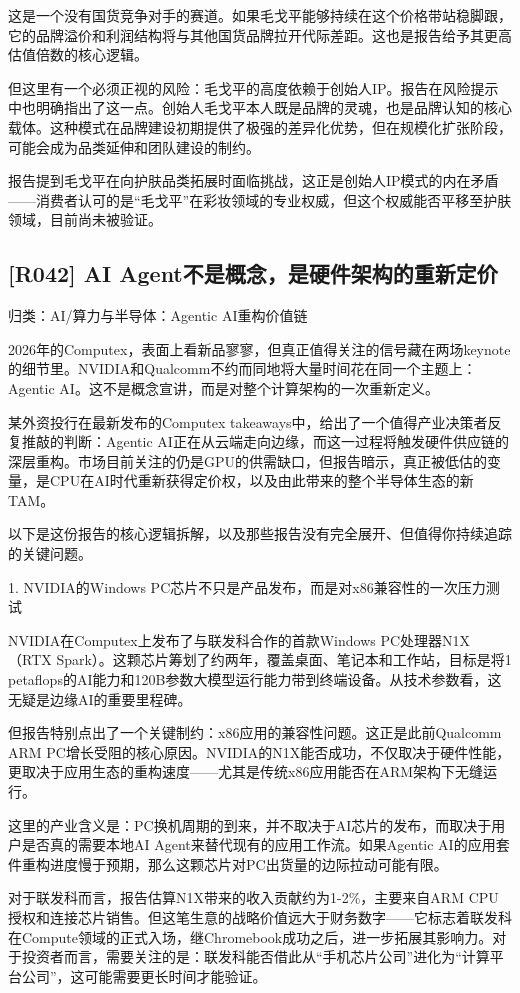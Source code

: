 \documentclass[11pt]{ctexart}
\begin{document}
这是一个没有国货竞争对手的赛道。如果毛戈平能够持续在这个价格带站稳脚跟，它的品牌溢价和利润结构将与其他国货品牌拉开代际差距。这也是报告给予其更高估值倍数的核心逻辑。

但这里有一个必须正视的风险：毛戈平的高度依赖于创始人IP。报告在风险提示中也明确指出了这一点。创始人毛戈平本人既是品牌的灵魂，也是品牌认知的核心载体。这种模式在品牌建设初期提供了极强的差异化优势，但在规模化扩张阶段，可能会成为品类延伸和团队建设的制约。

报告提到毛戈平在向护肤品类拓展时面临挑战，这正是创始人IP模式的内在矛盾——消费者认可的是“毛戈平”在彩妆领域的专业权威，但这个权威能否平移至护肤领域，目前尚未被验证。

\subsection{[R042] AI Agent不是概念，是硬件架构的重新定价}
{\small\color{refgray}归类：AI/算力与半导体：Agentic AI重构价值链}

2026年的Computex，表面上看新品寥寥，但真正值得关注的信号藏在两场keynote的细节里。NVIDIA和Qualcomm不约而同地将大量时间花在同一个主题上：Agentic AI。这不是概念宣讲，而是对整个计算架构的一次重新定义。

某外资投行在最新发布的Computex takeaways中，给出了一个值得产业决策者反复推敲的判断：Agentic AI正在从云端走向边缘，而这一过程将触发硬件供应链的深层重构。市场目前关注的仍是GPU的供需缺口，但报告暗示，真正被低估的变量，是CPU在AI时代重新获得定价权，以及由此带来的整个半导体生态的新TAM。

以下是这份报告的核心逻辑拆解，以及那些报告没有完全展开、但值得你持续追踪的关键问题。

1. NVIDIA的Windows PC芯片不只是产品发布，而是对x86兼容性的一次压力测试

NVIDIA在Computex上发布了与联发科合作的首款Windows PC处理器N1X（RTX Spark）。这颗芯片筹划了约两年，覆盖桌面、笔记本和工作站，目标是将1 petaflops的AI能力和120B参数大模型运行能力带到终端设备。从技术参数看，这无疑是边缘AI的重要里程碑。

但报告特别点出了一个关键制约：x86应用的兼容性问题。这正是此前Qualcomm ARM PC增长受阻的核心原因。NVIDIA的N1X能否成功，不仅取决于硬件性能，更取决于应用生态的重构速度——尤其是传统x86应用能否在ARM架构下无缝运行。

这里的产业含义是：PC换机周期的到来，并不取决于AI芯片的发布，而取决于用户是否真的需要本地AI Agent来替代现有的应用工作流。如果Agentic AI的应用套件重构进度慢于预期，那么这颗芯片对PC出货量的边际拉动可能有限。

对于联发科而言，报告估算N1X带来的收入贡献约为1-2\%，主要来自ARM CPU授权和连接芯片销售。但这笔生意的战略价值远大于财务数字——它标志着联发科在Compute领域的正式入场，继Chromebook成功之后，进一步拓展其影响力。对于投资者而言，需要关注的是：联发科能否借此从“手机芯片公司”进化为“计算平台公司”，这可能需要更长时间才能验证。
\end{document}
